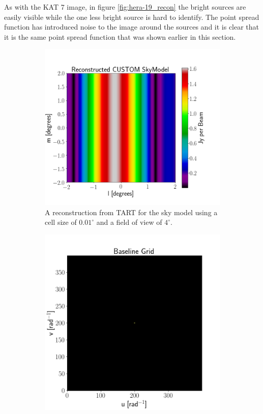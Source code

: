 As with the KAT 7 image, in figure \ref{fig:hera-19_recon} the bright sources are easily visible while the one less bright source is hard to identify. The point spread function has introduced noise to the image around the sources and it is clear that it is the same point spread function that was shown earlier in this section.

\begin{figure}[H]
  \centering
  \begin{subfigure}[b]{0.49\textwidth}
    \centering
    \includegraphics[scale=0.3]{images/RECON_TART_4_POINT.png}
    \caption{A reconstruction from TART for the sky model using a cell size of $0.01^\circ$ and a field of view of $4^\circ$.}
    \label{fig:TART_recon}
  \end{subfigure}
  \begin{subfigure}[b]{0.49\textwidth}
    \centering
    \includegraphics[scale=0.3]{images/TART_4_POINT_GRID.png}

\end{subfigure}
\end{figure}
